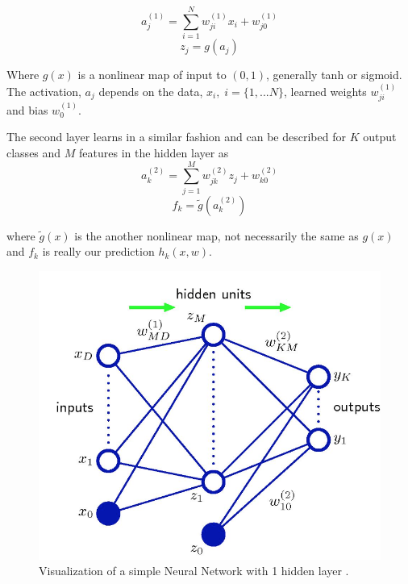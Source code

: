 \documentclass[12pt, twocolumn]{article}
\begin{document}
\begin{equation}
a_j^{(1)}= \sum_{i=1}^N w_{ji}^{(1)} x_i+w_{j0}^{(1)}
\end{equation}
\begin{equation}
z_j= g(a_j)
\end{equation}

Where $g(x)$ is a nonlinear map of input to $(0,1)$, generally tanh or sigmoid. The activation, $a_j$  depends on the data, $x_i, \; i=\{1,...N\}$, learned weights $w_{ji}^{(1)}$ and bias $w_0^{(1)}$. 

The second layer learns in a similar fashion and can be described for $K$ output classes and $M$ features in the hidden layer as
\begin{equation}
a_k^{(2)}= \sum_{j=1}^M w_{jk}^{(2)} z_j+w_{k0}^{(2)}
\end{equation}
\begin{equation}
f_k= \tilde{g}(a_k^{(2)})
\end{equation}
 
where $\tilde{g}(x)$ is the  another nonlinear map, not necessarily the same as $g(x)$ and $f_k$ is really our prediction $h_k(x,w)$. 

\begin{figure}
\includegraphics[scale=.6]{simpleNN.png}

\caption{Visualization of a simple Neural Network with 1 hidden layer \cite{Bishop} . }
\label{fig:basicNN}
\end{figure}
\end{document}
